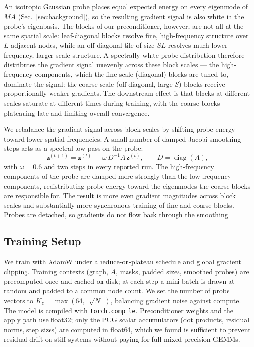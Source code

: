 \documentclass[acmtog,anonymous,review]{acmart}
\theoremstyle{plain}
\begin{document}
An isotropic Gaussian probe places equal expected energy on every eigenmode of $MA$
(Sec.~\ref{sec:background}), so the resulting gradient signal is also white in the probe's
eigenbasis. The blocks of our preconditioner, however, are not all at the same spatial
scale: leaf-diagonal blocks resolve fine, high-frequency structure over $L$ adjacent nodes,
while an off-diagonal tile of size $SL$ resolves much lower-frequency, larger-scale
structure. A spectrally white probe distribution therefore distributes the gradient signal
unevenly across these block scales --- the high-frequency components, which the
fine-scale (diagonal) blocks are tuned to, dominate the signal; the coarse-scale
(off-diagonal, large-$S$) blocks receive proportionally weaker gradients. The downstream
effect is that blocks at different scales saturate at different times during training, with
the coarse blocks plateauing late and limiting overall convergence.

We rebalance the gradient signal across block scales by shifting probe energy toward lower
spatial frequencies. A small number of damped-Jacobi smoothing steps acts as a spectral
low-pass on the probe:
\begin{equation}
  \mathbf{z}^{(t+1)} = \mathbf{z}^{(t)} \,-\, \omega\,D^{-1} A\,\mathbf{z}^{(t)},\qquad
  D = \operatorname{diag}(A),
  \label{eq:jacobi_smooth}
\end{equation}
with $\omega\!=\!0.6$ and two steps in every reported run. The high-frequency components of
the probe are damped more strongly than the low-frequency components, redistributing probe
energy toward the eigenmodes the coarse blocks are responsible for. The result is more
even gradient magnitudes across block scales and substantially more synchronous training of
fine and coarse blocks. Probes are detached, so gradients do not flow back through the
smoothing.

\subsection{Training Setup}

We train with AdamW under a reduce-on-plateau schedule and global gradient clipping. Training
contexts (graph, $A$, masks, padded sizes, smoothed probes) are precomputed once and cached
on disk; at each step a mini-batch is drawn at random and padded to a common node count. We
set the number of probe vectors to $K_z = \max(64,\lceil\sqrt{N}\rceil)$, balancing gradient
noise against compute. The model is compiled with \verb|torch.compile|. Preconditioner
weights and the apply path use float32; only the PCG scalar accumulators (dot products,
residual norms, step sizes) are computed in float64, which we found is sufficient to
prevent residual drift on stiff systems without paying for full mixed-precision GEMMs.
\end{document}
